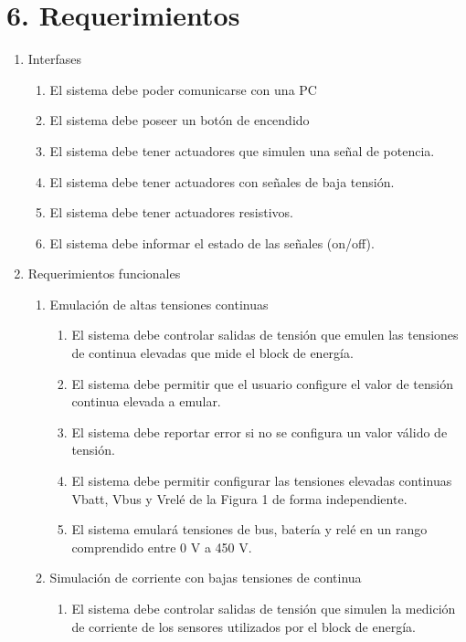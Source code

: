 \documentclass[
11pt, %
codirector, %
]{charter}
\begin{document}
\section{6. Requerimientos}
\label{sec:requerimientos}

\begin{enumerate}
	\item Interfases
	      \begin{enumerate}
		      \item El sistema debe poder comunicarse con una PC
		      \item El sistema debe poseer un botón de encendido
		      \item El sistema debe tener actuadores que simulen una señal de potencia.
		      \item El sistema debe tener actuadores con señales de baja tensión.
		      \item El sistema debe tener actuadores resistivos.
		      \item El sistema debe informar el estado de las señales (on/off).
	      \end{enumerate}
	\item Requerimientos funcionales
	      \begin{enumerate}
		      \item Emulación de altas tensiones continuas
		            \begin{enumerate}
			            \item El sistema debe controlar salidas de tensión que emulen las tensiones de continua elevadas que mide el block de energía.
			            \item El sistema debe permitir que el usuario configure el valor de tensión continua elevada a emular.
			            \item El sistema debe reportar error si no se configura un valor válido de tensión.
			            \item El sistema debe permitir configurar las tensiones elevadas continuas Vbatt, Vbus y Vrelé de la Figura 1 de forma independiente.
			            \item El sistema emulará tensiones de bus, batería y relé en un rango comprendido entre 0 V a 450 V.
		            \end{enumerate}
		      \item Simulación de corriente con bajas tensiones de continua
		            \begin{enumerate}
			            \item El sistema debe controlar salidas de tensión que simulen la medición de corriente de los sensores utilizados por el block de energía.

\end{enumerate}
\end{enumerate}
\end{enumerate}
\end{document}

